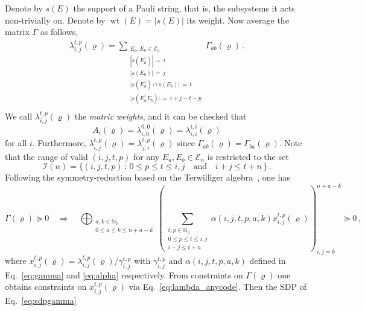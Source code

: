 \documentclass[12pt,a4paper]{amsart}
\DeclareMathOperator{\wt}{wt}
\newcommand{\N}{\mathds{N}}
\newcommand{\E}{\mathcal{E}}
\newcommand{\II}{\mathcal{I}}
\begin{document}
Denote by $s(E)$ the support of a Pauli string, that is, the subsystems it acts non-trivially on.
Denote by $\wt(E) = |s(E)|$ its weight. 
Now average the matrix $\Gamma$ as follows,
% 
\begin{align}\label{eq:lambda_anycode}
    \lambda^{t,p}_{i,j}(\varrho)= \!\!\!\! \sum\limits_{
        \substack{E_a,E_b\in \E_n \\|s(E^\dagger_a)| \,=\, i
            \\ |s(E_b)| \,= \,j 
            \\ \lvert s(E^\dagger_a)\cap s(E_b)\rvert \,= \,t
            \\ \lvert s(E^\dagger_aE_b)\rvert \, = \, i+j-t-p \\}} \!\!\!\!\!\! \Gamma_{ab}(\varrho)  \,.
\end{align}
% 
We call $\lambda^{t,p}_{i,j}(\varrho)$ the \emph{matrix weights}, and it can be checked that
\begin{equation}\label{eq:Alambda}
A_i(\varrho)=\lambda^{0,0}_{i,0}(\varrho)=\lambda^{i,i}_{i,i}(\varrho)
\end{equation} for all $i$.
% 
Furthermore, $\lambda^{t,p}_{i,j}(\varrho)=\lambda^{t,p}_{j,i}(\varrho)$ since $\Gamma_{ab}(\varrho)=\Gamma_{ba}(\varrho)$.
% 
Note that the range of valid $(i,j,t,p)$ for any $E_a, E_b\in \E_n$ is restricted to the set
% 
\begin{equation}\label{eq:I-range}
 \II(n)= \{ (i, j, t, p)\,:\, 0 \leq p \leq t \leq i,j \quad \text{and} \quad i+j \leq t+n\, \}\,.
\end{equation}
% 
Following the symmetry-reduction based on the Terwilliger algebra~\cite{GIJSWIJT20061719}, one has
% 
\begin{equation} \label{eq:psd}
	\Gamma(\varrho) \succeq 0 \quad  \Longrightarrow \quad \bigoplus_{\substack{a,k \in \N_0\\ 0\leq a\leq k\leq n+a-k}}
	\left(\sum\limits_{\substack{t,p\in \N_0 \\ 0 \leq p \leq t \leq i,j \\ i+j\leq t+n}} \alpha(i,j,t,p,a,k)x_{i,j}^{t,p}(\varrho)\right)_{i,j=k}^{n+a-k} \succeq 0\,,
\end{equation}
% 
where $x^{t,p}_{i,j}(\varrho)=\lambda^{t,p}_{i,j}(\varrho)/\gamma^{t,p}_{i,j}$ with  $\gamma^{t,p}_{i,j}$ and $\alpha(i,j,t,p,a,k)$ defined in Eq.~\eqref{eq:gamma} and \eqref{eq:alpha} respectively.
% 
From constraints on 
$\Gamma(\varrho)$
one obtains constraints on $x^{t,p}_{i,j}(\varrho)$
via
Eq.~\eqref{eq:lambda_anycode}.
% 
Then the SDP of Eq.~\eqref{eq:sdpgamma} 
\end{document}
